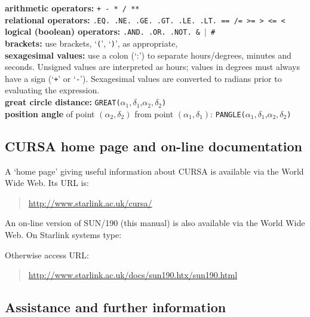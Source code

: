 \documentclass[twoside,11pt]{starlink}
\begin{document}
\textbf{arithmetic operators:} \texttt{+ - * / **}  \\
\textbf{relational operators:}  \texttt{.EQ. .NE. .GE. .GT. .LE.
   .LT. == /= >= > <= <}  \\
\textbf{logical (boolean) operators:} \texttt{.AND. .OR. .NOT. \& $|$ \# }  \\
\textbf{brackets:} use brackets, `\texttt{(}', `\texttt{)}', as appropriate,  \\
\textbf{sexagesimal values:} use a colon (`:') to separate
   hours/degrees, minutes and seconds. Unsigned values are interpreted
   as hours; values in degrees must always have a sign (`\texttt{+}' or
   `\texttt{-}'). Sexagesimal values are converted to radians prior to
   evaluating the expression.  \\
\textbf{great circle distance:}
   \texttt{GREAT(}$\alpha_{1},\delta_{1}$,$\alpha_{2},\delta_{2}$\texttt{)} \\
\textbf{position angle} of point $(\alpha_{2},\delta_{2})$ from point
  $(\alpha_{1},\delta_{1})$:
  \texttt{PANGLE(}$\alpha_{1},\delta_{1}$,$\alpha_{2},\delta_{2}$\texttt{)}
\newpage




\subsection*{CURSA home page and on-line documentation}
\label{HOMEPAGE}

A `home page' giving useful information about CURSA is available via
the World Wide Web. Its URL is:

\begin{quote}
\url{http://www.starlink.ac.uk/cursa/}
\end{quote}

An on-line version of SUN/190 (this manual) is also available via the
World Wide Web.  On Starlink systems type:

\begin{terminalv}
\end{terminalv}

Otherwise access URL:

\begin{quote}
\url{http://www.starlink.ac.uk/docs/sun190.htx/sun190.html}
\end{quote}


\subsection*{Assistance and further information}
\end{document}
